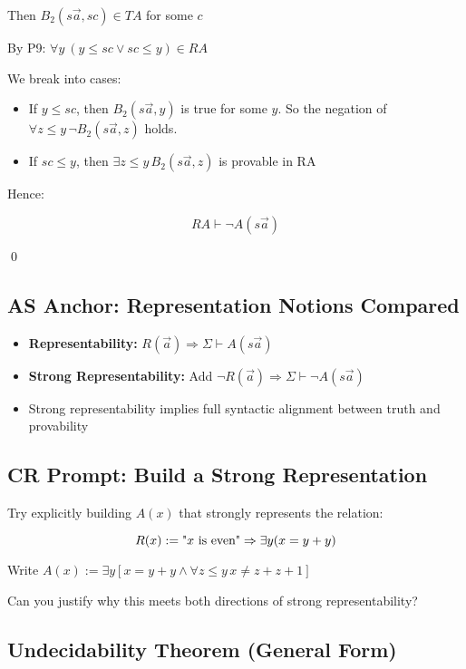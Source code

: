 \documentclass[12pt]{article}
\begin{document}
Then \( B_2(s\vec{a}, sc) \in TA \) for some \( c \)

By P9: \( \forall y\ (y \leq sc \vee sc \leq y) \in RA \)

We break into cases:

\begin{itemize}
  \item If \( y \leq sc \), then \( B_2(s\vec{a}, y) \) is true for some \( y \). So the negation of \( \forall z \leq y\, \neg B_2(s\vec{a}, z) \) holds.
  \item If \( sc \leq y \), then \( \exists z \leq y\, B_2(s\vec{a}, z) \) is provable in RA
\end{itemize}

Hence:

\[
RA \vdash \neg A(s\vec{a})
\]

\qed

\subsection*{AS Anchor: Representation Notions Compared}

\begin{itemize}
  \item \textbf{Representability:} \( R(\vec{a}) \Rightarrow \Sigma \vdash A(s\vec{a}) \)
  \item \textbf{Strong Representability:} Add \( \neg R(\vec{a}) \Rightarrow \Sigma \vdash \neg A(s\vec{a}) \)
  \item Strong representability implies full syntactic alignment between truth and provability
\end{itemize}

\subsection*{CR Prompt: Build a Strong Representation}

Try explicitly building \( A(x) \) that strongly represents the relation:

\[
R(x) := \text{"\( x \) is even"}
\Rightarrow \exists y(x = y + y)
\]

Write \( A(x) := \exists y[ x = y + y \wedge \forall z \leq y\, x \neq z + z + 1 ] \)

Can you justify why this meets both directions of strong representability?

\subsection{Undecidability Theorem (General Form)}
\end{document}
